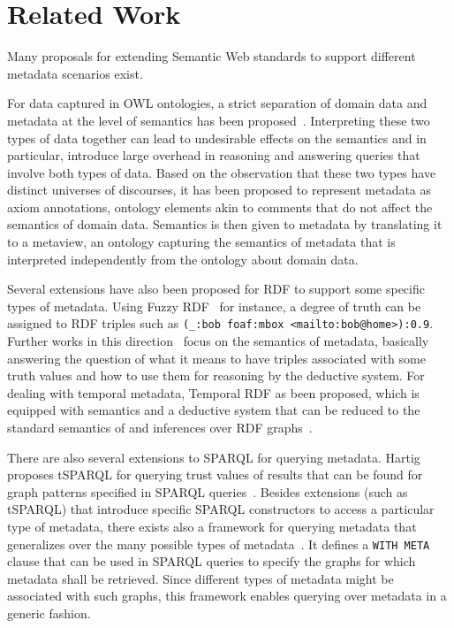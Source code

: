 \section{Related Work} Many proposals for extending Semantic Web standards to support different metadata scenarios exist. 

For data captured in OWL ontologies, a strict separation of domain data and metadata at the level of semantics has been proposed~\cite{DBLP:conf/aaai/TranHMGH08}. Interpreting these two types of data together can lead to undesirable effects on the semantics and in particular, introduce large overhead in reasoning and answering queries that involve both types of data. Based on the observation that these two types have distinct universes of discourses, it has been proposed to represent metadata as axiom annotations, ontology elements akin to comments that do not affect the semantics of domain data. Semantics is then given to metadata by translating it to a metaview, an ontology capturing the semantics of metadata that is interpreted independently from the ontology about domain data.  

Several extensions have also been proposed for RDF to support some specific types of metadata. Using Fuzzy RDF~\cite{DBLP:conf/rr/Straccia09} for instance, a degree of truth can be assigned to RDF triples such as \verb+(_:bob foaf:mbox <mailto:bob@home>):0.9+. Further works in this direction~\cite{swap2004,DBLP:conf/semweb/MazzieriD05} focus on the semantics of metadata, basically answering the question of what it means to have triples associated with some truth values and how to use them for reasoning by the deductive system. For dealing with temporal metadata, Temporal RDF as been proposed, which is equipped with semantics and a deductive system that can be reduced to the standard semantics of and inferences over RDF graphs~\cite{DBLP:journals/tkde/GutierrezHV07}. 

There are also several extensions to SPARQL for querying metadata. Hartig proposes tSPARQL for querying trust values of results that can be found for graph patterns specified in SPARQL queries~\cite{DBLP:conf/esws/Hartig09}. Besides extensions (such as tSPARQL) that introduce specific SPARQL constructors to access a particular type of metadata, there exists also a framework for querying metadata that generalizes over the many possible types of metadata~\cite{DBLP:conf/www/SchuelerSST08}. It defines a \verb+WITH META+ clause that can be used in SPARQL queries to specify the graphs for which metadata shall be retrieved. Since different types of metadata might be associated with such graphs, this framework enables querying over metadata in a generic fashion.  

